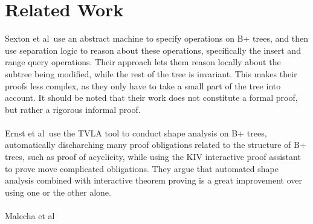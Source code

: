 \section{Related Work}
\label{sec:RelatedWork}
Sexton et al\,\cite{sexton2008reasoning} use an abstract machine to specify operations on B+ trees, and then use separation logic to reason about these operations, specifically the insert and range query operations. Their approach lets them reason locally about the subtree being modified, while the rest of the tree is invariant. This makes their proofs less complex, as they only have to take a small part of the tree into account. It should be noted that their work does not constitute a formal proof, but rather a rigorous informal proof.

\paragraph{}
Ernst et al\,\cite{ernst2011verification} use the TVLA tool to conduct shape analysis on B+ trees, automatically discharching many proof obligations related to the structure of B+ trees, such as proof of acyclicity, while using the KIV interactive proof assistant to prove move complicated obligations. They argue that automated shape analysis combined with interactive theorem proving is a great improvement over using one or the other alone.

\paragraph{}
Malecha et al\,\cite{malecha2010toward} 
